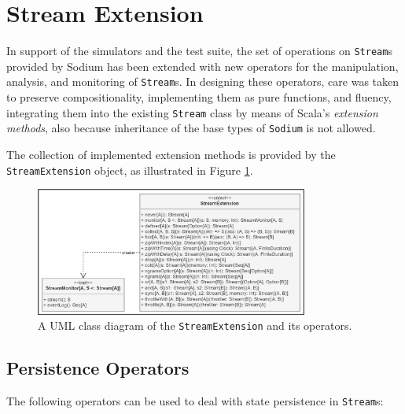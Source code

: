 
\section{Stream Extension}
\label{section:implementation:stream-extension}

In support of the simulators and the test suite, the set of operations on
\texttt{Stream}s provided by Sodium has been extended with new operators for
the manipulation, analysis, and monitoring of \texttt{Stream}s. In designing
these operators, care was taken to preserve compositionality, implementing them
as pure functions, and fluency, integrating them into the existing
\texttt{Stream} class by means of Scala's \textit{extension methods}, also
because inheritance of the base types of \texttt{Sodium} is not allowed.

The collection of implemented extension methods is provided by the
\texttt{StreamEx\-tension} object, as illustrated in Figure
\ref{figure:stream-extension-class-diagram}.

\begin{figure}[!ht]
  \centering
  \includegraphics[width=0.8\textwidth]{resources/figures/stream-extension-class-diagram.png}
  \caption[A UML class diagram of the stream extension]{
    A UML class diagram of the \texttt{StreamExtension}
    and its operators.
  }
  \label{figure:stream-extension-class-diagram}
\end{figure}

\subsection{Persistence Operators}

The following operators can be used to deal with state persistence in
\texttt{Stream}s:


